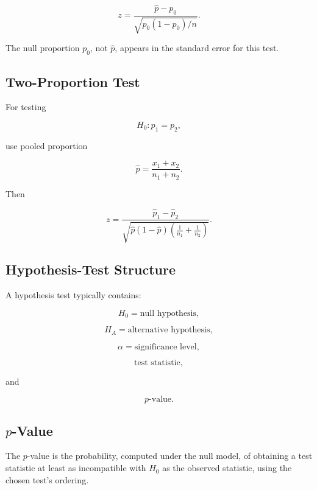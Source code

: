 \[
\boxed{
z
=
\frac{
\hat p-p_0
}{
\sqrt{
p_0(1-p_0)/n
}
}.
}
\]

The null proportion \(p_0\), not \(\hat p\), appears in the standard error
for this test.

\subsection{Two-Proportion Test}
\label{subsec:two-proportion-test-reference}

For testing

\[
H_0:p_1=p_2,
\]

use pooled proportion

\[
\boxed{
\hat p
=
\frac{
x_1+x_2
}{
n_1+n_2
}.
}
\]

Then

\[
\boxed{
z
=
\frac{
\hat p_1-\hat p_2
}{
\sqrt{
\hat p(1-\hat p)
\left(
\frac1{n_1}
+
\frac1{n_2}
\right)
}
}.
}
\]

\subsection{Hypothesis-Test Structure}
\label{subsec:hypothesis-test-structure}

A hypothesis test typically contains:

\[
\boxed{
H_0
=
\text{null hypothesis},
}
\]

\[
\boxed{
H_A
=
\text{alternative hypothesis},
}
\]

\[
\boxed{
\alpha
=
\text{significance level},
}
\]

\[
\boxed{
\text{test statistic},
}
\]

and

\[
\boxed{
p\text{-value}.
}
\]

\subsection{\(p\)-Value}
\label{subsec:p-value-reference}

The \(p\)-value is the probability, computed under the null model, of
obtaining a test statistic at least as incompatible with \(H_0\) as the
observed statistic, using the chosen test's ordering.


